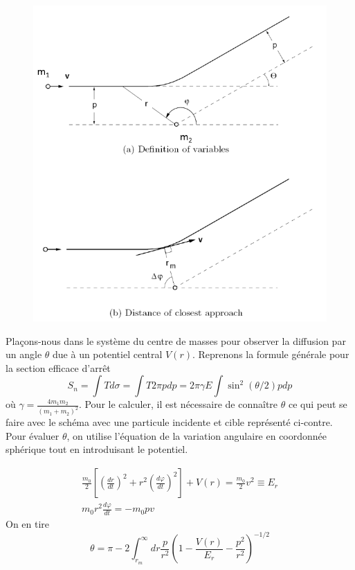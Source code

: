 	\begin{figure}
	\vspace{-11mm}
	\includegraphics[scale=0.34]{ch2/image7.png}
	\end{figure}
Plaçons-nous dans le système du centre de masses pour observer la diffusion par un angle 
$\theta$ due à un potentiel central $V(r)$. Reprenons la formule générale pour la section efficace
d'arrêt 
\begin{equation}
S_n = \int Td\sigma = \int T 2\pi p dp = 2\pi\gamma E\int \sin^2(\theta/2)pdp
\end{equation}
où $\gamma = \frac{4m_1m_2}{(m_1+m_2)^2}$. Pour le calculer, il est nécessaire de connaître $\theta$
ce qui peut se faire avec le schéma avec une particule incidente et cible représenté ci-contre.\\

Pour évaluer $\theta$, on utilise l'équation de la variation angulaire en coordonnée sphérique tout
en introduisant le potentiel. 

\begin{eqnarray*}
\frac{m_0}{2}\left[ \left( \frac{dr}{dt}\right)^2+r^2\left( \frac{d\varphi}{dt}\right)^{2}\right]+V(r)=\frac{m_0}{2}v^2\equiv E_r\\
m_0r^2\frac{d\varphi}{dt}=-m_0pv
\end{eqnarray*}
On en tire
\begin{equation}
\theta=\pi-2\int_{r_{m}}^\infty dr \frac{p}{r^2}\left( 1-\frac{V(r)}{E_r}-\frac{p^2}{r^2}\right)^{-1/2}
\end{equation}


